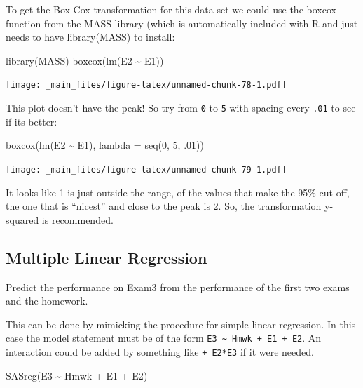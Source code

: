 \documentclass[
]{book}
\newenvironment{Shaded}{\begin{snugshade}}{\end{snugshade}}
\newcommand{\AttributeTok}[1]{\textcolor[rgb]{0.77,0.63,0.00}{#1}}
\newcommand{\DecValTok}[1]{\textcolor[rgb]{0.00,0.00,0.81}{#1}}
\newcommand{\FunctionTok}[1]{\textcolor[rgb]{0.00,0.00,0.00}{#1}}
\newcommand{\NormalTok}[1]{#1}
\newcommand{\SpecialCharTok}[1]{\textcolor[rgb]{0.00,0.00,0.00}{#1}}
\begin{document}
To get the Box-Cox transformation for this data set we could use the boxcox function from the MASS library (which is automatically included with R and just needs to have library(MASS) to install:

\begin{Shaded}
\begin{Highlighting}[]
\FunctionTok{library}\NormalTok{(MASS)}
\FunctionTok{boxcox}\NormalTok{(}\FunctionTok{lm}\NormalTok{(E2 }\SpecialCharTok{\textasciitilde{}}\NormalTok{ E1))}
\end{Highlighting}
\end{Shaded}

\texttt{[image: \_main\_files/figure-latex/unnamed-chunk-78-1.pdf]}

This plot doesn't have the peak! So try from \texttt{0} to \texttt{5} with spacing every \texttt{.01} to see if its better:

\begin{Shaded}
\begin{Highlighting}[]
\FunctionTok{boxcox}\NormalTok{(}\FunctionTok{lm}\NormalTok{(E2 }\SpecialCharTok{\textasciitilde{}}\NormalTok{ E1), }\AttributeTok{lambda =} \FunctionTok{seq}\NormalTok{(}\DecValTok{0}\NormalTok{, }\DecValTok{5}\NormalTok{, .}\DecValTok{01}\NormalTok{))}
\end{Highlighting}
\end{Shaded}

\texttt{[image: \_main\_files/figure-latex/unnamed-chunk-79-1.pdf]}

It looks like 1 is just outside the range, of the values that make the 95\% cut-off, the one that is ``nicest'' and close to the peak is 2. So, the transformation y-squared is recommended.

\hypertarget{multiple-linear-regression}{%
\subsection{Multiple Linear Regression}\label{multiple-linear-regression}}

Predict the performance on Exam3 from the performance of the first two exams and the homework.

This can be done by mimicking the procedure for simple linear regression. In this case the model statement must be of the form \texttt{E3\ \textasciitilde{}\ Hmwk\ +\ E1\ +\ E2}. An interaction could be added by something like \texttt{+\ E2*E3} if it were needed.

\begin{Shaded}
\begin{Highlighting}[]
\FunctionTok{SASreg}\NormalTok{(E3 }\SpecialCharTok{\textasciitilde{}}\NormalTok{ Hmwk }\SpecialCharTok{+}\NormalTok{ E1 }\SpecialCharTok{+}\NormalTok{ E2)}
\end{Highlighting}
\end{Shaded}
\end{document}
